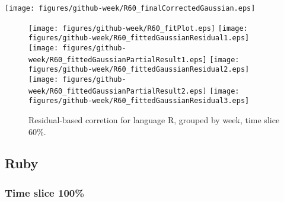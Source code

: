 \begin{center}
{\texttt{[image: figures/github-week/R60\_finalCorrectedGaussian.eps]}}
\end{center}

\FloatBarrier

\begin{figure}[t]
\centering
{}
{\texttt{[image: figures/github-week/R60\_fitPlot.eps]}}
{\texttt{[image: figures/github-week/R60\_fittedGaussianResidual1.eps]}}
{\texttt{[image: figures/github-week/R60\_fittedGaussianPartialResult1.eps]}}
{\texttt{[image: figures/github-week/R60\_fittedGaussianResidual2.eps]}}
{\texttt{[image: figures/github-week/R60\_fittedGaussianPartialResult2.eps]}}
{\texttt{[image: figures/github-week/R60\_fittedGaussianResidual3.eps]}}
\caption{Residual-based corretion for language R, grouped by week, time slice 60\%.}
\end{figure}


\FloatBarrier


\subsection{Ruby}

\subsubsection{Time slice 100\%}

